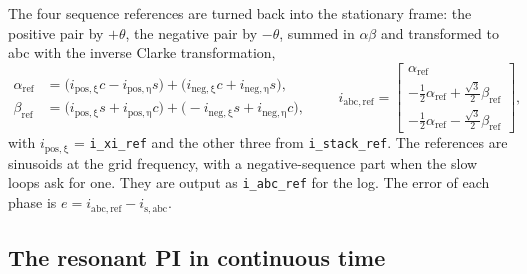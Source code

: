 \documentclass[11pt,a4paper]{scrartcl}
\newcommand{\ped}[1]{_{\mathrm{#1}}}
\newcommand{\code}[1]{\texttt{#1}}
\begin{document}
\begin{onehalfspace}
The four sequence references are turned back into the stationary frame: the positive pair by $+\theta$, the negative pair by $-\theta$, summed in $\alpha\beta$ and transformed to abc with the inverse Clarke transformation,
\begin{equation}
	\begin{aligned}
		\alpha\ped{ref} &= \big(i\ped{pos,\xi} c - i\ped{pos,\eta} s\big) + \big(i\ped{neg,\xi} c + i\ped{neg,\eta} s\big), \\
		\beta\ped{ref}  &= \big(i\ped{pos,\xi} s + i\ped{pos,\eta} c\big) + \big(-i\ped{neg,\xi} s + i\ped{neg,\eta} c\big),
	\end{aligned}
	\qquad
	i\ped{abc,ref} = \begin{bmatrix} \alpha\ped{ref} \\ -\tfrac12\alpha\ped{ref} + \tfrac{\sqrt3}{2}\beta\ped{ref} \\ -\tfrac12\alpha\ped{ref} - \tfrac{\sqrt3}{2}\beta\ped{ref} \end{bmatrix},
	\label{eq:iref}
\end{equation}
with $i\ped{pos,\xi}$ = \code{i\_xi\_ref} and the other three from \code{i\_stack\_ref}. The references are sinusoids at the grid frequency, with a negative-sequence part when the slow loops ask for one. They are output as \code{i\_abc\_ref} for the log. The error of each phase is $e = i\ped{abc,ref} - i\ped{s,abc}$.

\subsection{The resonant PI in continuous time}
\label{sec:rpi_cont}


\end{onehalfspace}
\end{document}
